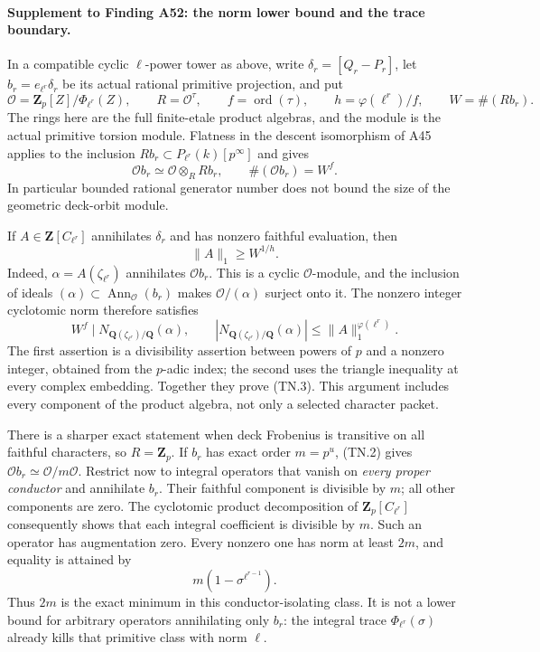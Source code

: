 \documentclass[11pt,a4paper]{article}
\begin{document}
\paragraph{Supplement to Finding A52: the norm lower bound and the trace boundary.}
In a compatible cyclic $\ell$-power tower as above, write
$\delta_r=[Q_r-P_r]$, let $b_r=e_{\ell^r}\delta_r$ be its actual
rational primitive projection, and put
\[
 \mathcal O=\mathbf Z_p[Z]/\Phi_{\ell^r}(Z),\qquad
 R=\mathcal O^\tau,\qquad f=\operatorname{ord}(\tau),\qquad
 h=\varphi(\ell^r)/f,\qquad W=\#(Rb_r).
\tag{TN.1}
\]
The rings here are the full finite-etale product algebras, and the
module is the actual primitive torsion module. Flatness in the
descent isomorphism of A45 applies to the inclusion
$Rb_r\subset P_{\ell^r}(k)[p^\infty]$ and gives
\[
                       \mathcal O b_r\simeq
                       \mathcal O\otimes_R Rb_r,
                   \qquad \#(\mathcal O b_r)=W^f.
\tag{TN.2}
\]
In particular bounded rational generator number does not bound the
size of the geometric deck-orbit module.

If $A\in\mathbf Z[C_{\ell^r}]$ annihilates $\delta_r$ and has nonzero
faithful evaluation, then
\[
                              \|A\|_1\ge W^{1/h}.
\tag{TN.3}
\]
Indeed, $\alpha=A(\zeta_{\ell^r})$ annihilates $\mathcal O b_r$.
This is a cyclic $\mathcal O$-module, and the inclusion of ideals
$(\alpha)\subset\operatorname{Ann}_{\mathcal O}(b_r)$ makes
$\mathcal O/(\alpha)$ surject onto it. The nonzero integer
cyclotomic norm therefore satisfies
\[
 W^f\mid N_{\mathbf Q(\zeta_{\ell^r})/\mathbf Q}(\alpha),
 \qquad
 \left|N_{\mathbf Q(\zeta_{\ell^r})/\mathbf Q}(\alpha)\right|
                   \le\|A\|_1^{\varphi(\ell^r)}.
\tag{TN.4}
\]
The first assertion is a divisibility assertion between powers of
$p$ and a nonzero integer, obtained from the $p$-adic index; the
second uses the triangle inequality at every complex embedding.
Together they prove (TN.3). This argument includes every component
of the product algebra, not only a selected character packet.

There is a sharper exact statement when deck Frobenius is transitive
on all faithful characters, so $R=\mathbf Z_p$. If $b_r$ has exact
order $m=p^u$, (TN.2) gives
$\mathcal O b_r\simeq\mathcal O/m\mathcal O$.
Restrict now to integral operators that vanish on \emph{every proper
conductor} and annihilate $b_r$. Their faithful component is divisible
by $m$; all other components are zero. The cyclotomic product
decomposition of $\mathbf Z_p[C_{\ell^r}]$ consequently shows that
each integral coefficient is divisible by $m$. Such an operator
has augmentation zero. Every nonzero one has norm at least $2m$,
and equality is attained by
\[
                         m(1-\sigma^{\ell^{r-1}}).
\tag{TN.5}
\]
Thus $2m$ is the exact minimum in this conductor-isolating class.
It is not a lower bound for arbitrary operators annihilating only
$b_r$: the integral trace $\Phi_{\ell^r}(\sigma)$ already kills
that primitive class with norm $\ell$.
\end{document}
